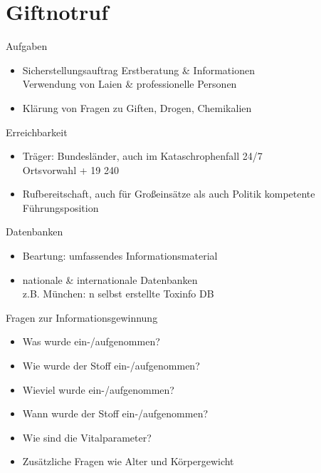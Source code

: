 \section{Giftnotruf}
\begin{sectionbox}{Aufgaben}
    \begin{itemize}
        \item Sicherstellungsauftrag Erstberatung \& Informationen\\
        \ra Verwendung von Laien \& professionelle Personen
        \item Klärung von Fragen zu Giften, Drogen, Chemikalien
    \end{itemize}
\end{sectionbox}
\begin{sectionbox}{Erreichbarkeit}
    \begin{itemize}
        \item Träger: Bundesländer, auch im Kataschrophenfall 24/7\\
        \ra Ortsvorwahl + 19 240
        \item Rufbereitschaft, auch für Großeinsätze als auch Politik
        \ra kompetente Führungsposition
    \end{itemize}
\end{sectionbox}
\begin{sectionbox}{Datenbanken}
    \begin{itemize}
        \item Beartung: umfassendes Informationsmaterial
        \item nationale \& internationale Datenbanken\\
        \ra z.B. München: n selbst erstellte Toxinfo DB 
    \end{itemize}
\end{sectionbox}
\begin{warningbox}{Fragen zur Informationsgewinnung}
    \begin{itemize}
        \item Was wurde ein-/aufgenommen?
        \item Wie wurde der Stoff ein-/aufgenommen?
        \item Wieviel wurde ein-/aufgenommen?
        \item Wann wurde der Stoff ein-/aufgenommen?
        \item Wie sind die Vitalparameter?
        \item Zusätzliche Fragen wie Alter und Körpergewicht
    \end{itemize}
\end{warningbox}